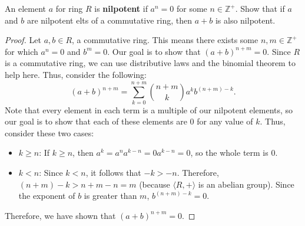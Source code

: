 \documentclass[12pt, oneside]{book}
\newcommand{\pf}[1]{
    \begin{customframedproof}[linecolor=horange!75]
        \begin{proof}
        #1
        \end{proof}
    \end{customframedproof}
}
\newcommand{\Z}{\mathbb{Z}}
\begin{document}
\begin{enumerate}[label=\textbf{\arabic*.}]
        An element \(a\) for ring \(R\) is \textbf{nilpotent} if \(a^{n} = 0\) for some \(n \in \Z^{+}\). Show that if \(a\) and \(b\) are nilpotent elts of a commutative ring, then \(a + b\) is also nilpotent. 
    \pf{
        Let \(a,b \in R\), a commutative ring. This means there exists some \(n,m\in \Z^{+}\) for which \(a^{n} = 0\) and \(b^{m} = 0\). Our goal is to show that \((a + b)^{n + m} = 0\). Since \(R\) is a commutative ring, we can use distributive laws and the binomial theorem to help here. Thus, consider the following:
        \[
            (a + b)^{n + m} = \sum^{n + m}_{k=0} \binom{n + m}{k} a^{k}b^{(n + m)-k}.
        \]
        Note that every element in each term is a multiple of our nilpotent elements, so our goal is to show that each of these elements are 0 for any value of \(k\). Thus, consider these two cases:
        \begin{itemize}[topsep=2pt]
            \item \textbf{\(k \ge n\)}: If \(k \ge n\), then \(a^{k} = a^{n}a^{k -n} = 0a^{k - n} = 0\), so the whole term is 0.
            \item \textbf{\(k < n\)}: Since \(k < n\), it follows that \(-k > -n\). Therefore, \((n + m) - k > n + m - n = m\) (because \(\langle R, + \rangle\) is an abelian group). Since the exponent of \(b\) is greater than \(m\), \(b^{(n + m)-k} = 0\). 
        \end{itemize}
        Therefore, we have shown that \((a + b)^{n + m} = 0\).
    }
\end{enumerate}
\end{document}
